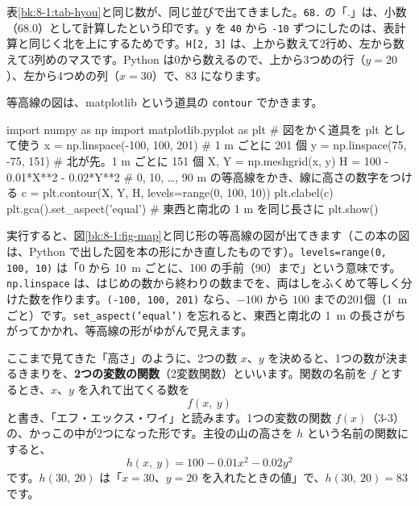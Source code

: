 \noindent 表\ref{bk:8-1:tab-hyou}と同じ数が、同じ並びで出てきました。\texttt{68.} の「.」は、小数（68.0）として計算したという印です。\texttt{y} を \texttt{40} から \texttt{-10} ずつにしたのは、表計算と同じく北を上にするためです。\texttt{H[2, 3]} は、上から数えて2行め、左から数えて3列めのマスです。Python は0から数えるので、上から3つめの行（$y=20$）、左から4つめの列（$x=30$）で、83 になります。

等高線の図は、matplotlib という道具の \texttt{contour} でかきます。

\begin{bkcode}[Python]
import numpy as np
import matplotlib.pyplot as plt  \# 図をかく道具を plt として使う
x = np.linspace(-100, 100, 201)  \# 1 m ごとに 201 個
y = np.linspace(75, -75, 151)    \# 北が先。1 m ごとに 151 個
X, Y = np.meshgrid(x, y)
H = 100 - 0.01*X**2 - 0.02*Y**2
\# 0, 10, …, 90 m の等高線をかき、線に高さの数字をつける
c = plt.contour(X, Y, H, levels=range(0, 100, 10))
plt.clabel(c)
plt.gca().set\_aspect('equal')   \# 東西と南北の 1 m を同じ長さに
plt.show()
\end{bkcode}

\noindent 実行すると、図\ref{bk:8-1:fig-map}と同じ形の等高線の図が出てきます（この本の図は、Python で出した図を本の形にかき直したものです）。\texttt{levels=}\allowbreak\texttt{range(0,}\allowbreak\texttt{ 100,}\allowbreak\texttt{ 10)} は「0 から \qty{10}{m} ごとに、100 の手前（90）まで」という意味です。\texttt{np.linspace} は、はじめの数から終わりの数までを、両はしをふくめて等しく分けた数を作ります。\texttt{(-100, 100, 201)} なら、$-100$ から $100$ までの201個（\qty{1}{m} ごと）です。\texttt{set\_aspect('equal')} を忘れると、東西と南北の \qty{1}{m} の長さがちがってかかれ、等高線の形がゆがんで見えます。




\label{bk:8-1:kansuu}ここまで見てきた「高さ」のように、2つの数 $x$、$y$ を決めると、1つの数が決まるきまりを、\textbf{2つの変数の関数}（2変数関数）といいます。関数の名前を $f$ とするとき、$x$、$y$ を入れて出てくる数を
\[ f(x,\ y) \]
と書き、「エフ・エックス・ワイ」と読みます。1つの変数の関数 $f(x)$（3-3）の、かっこの中が2つになった形です。主役の山の高さを $h$ という名前の関数にすると、
\[ h(x,\ y)=100-0.01x^2-0.02y^2 \]
です。$h(30,\ 20)$ は「$x=30$、$y=20$ を入れたときの値」で、$h(30,\ 20)=83$ です。

